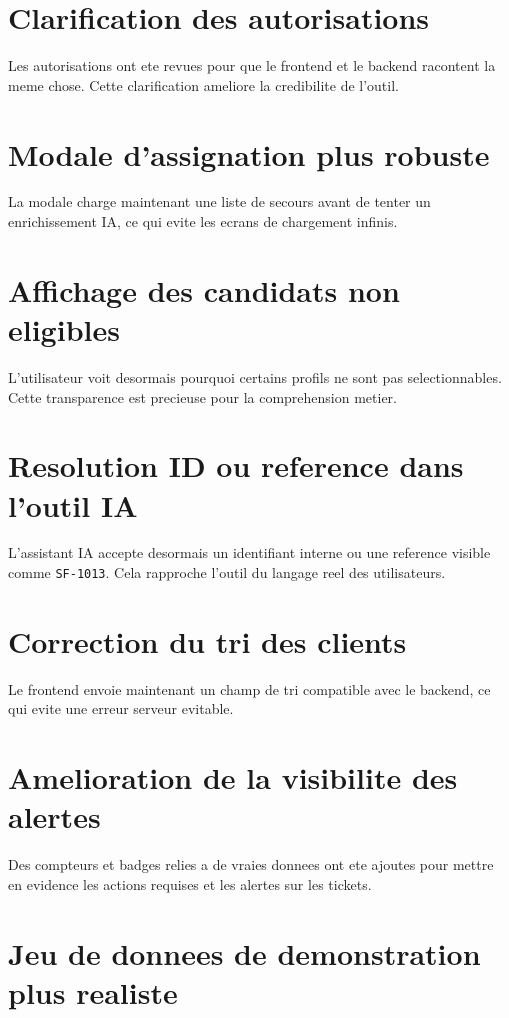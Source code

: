 \documentclass[12pt,a4paper,oneside]{report}
\begin{document}
\section{Clarification des autorisations}

Les autorisations ont ete revues pour que le frontend et le backend racontent la meme chose. Cette clarification ameliore la credibilite de l'outil.

\section{Modale d'assignation plus robuste}

La modale charge maintenant une liste de secours avant de tenter un enrichissement IA, ce qui evite les ecrans de chargement infinis.

\section{Affichage des candidats non eligibles}

L'utilisateur voit desormais pourquoi certains profils ne sont pas selectionnables. Cette transparence est precieuse pour la comprehension metier.

\section{Resolution ID ou reference dans l'outil IA}

L'assistant IA accepte desormais un identifiant interne ou une reference visible comme \texttt{SF-1013}. Cela rapproche l'outil du langage reel des utilisateurs.

\section{Correction du tri des clients}

Le frontend envoie maintenant un champ de tri compatible avec le backend, ce qui evite une erreur serveur evitable.

\section{Amelioration de la visibilite des alertes}

Des compteurs et badges relies a de vraies donnees ont ete ajoutes pour mettre en evidence les actions requises et les alertes sur les tickets.

\section{Jeu de donnees de demonstration plus realiste}
\end{document}
